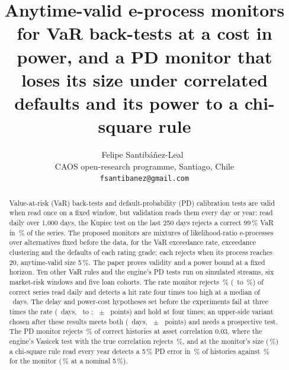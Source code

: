 \documentclass[11pt]{article}
\title{Anytime-valid e-process monitors for VaR back-tests at a cost in power, and a PD monitor that loses its size under correlated defaults and its power to a chi-square rule}
\author{Felipe Santib\'a\~nez-Leal~\orcidlink{0000-0002-0150-3246}\\
\small CAOS open-research programme, Santiago, Chile\\
\small \texttt{fsantibanez@gmail.com}}
\date{\docdate}
\begin{document}
\maketitle
\headerblock

\begin{abstract}
Value-at-risk (VaR) back-tests and default-probability (PD) calibration tests are valid when read once on a fixed window, but validation reads them every day or year:
read daily over 1,000 days, the Kupiec test on the last 250 days rejects a correct 99\,\% VaR in \nNullSizeKupTrail\,\% of the series. The proposed monitors are mixtures of likelihood-ratio e-processes over alternatives fixed before the data, for the VaR exceedance rate, exceedance clustering and the defaults of each rating grade;
each rejects when its process reaches 20, anytime-valid size 5\,\%. The paper proves validity and a power bound at a fixed horizon.
Ten other VaR rules and the engine's PD tests run on simulated streams, six market-risk windows and five loan cohorts. The rate monitor rejects \nNullSizeE\,\% (\nNullSizeELo\ to \nNullSizeEHi\,\%) of correct series read daily and detects a hit rate four times too high at a median of \nSeedsFourMed\ days.
The delay and power-cost hypotheses set before the experiments fail at three times the rate (\nSeedsThreeMed\ days, \nSeedsThreeMedLo\ to \nSeedsThreeMedHi; \nSeedsThreeCost\ $\pm$ \nSeedsThreeCostSe\ points) and hold at four times; an upper-side variant chosen after these results meets both (\nSeedsUpThreeMed\ days, \nSeedsUpThreeCost\ $\pm$ \nSeedsUpThreeCostSe\ points) and needs a prospective test.
The PD monitor rejects \nRhoZeroThreeAvg\,\% of correct histories at asset correlation $0.03$, where the engine's Vasicek test with the true correlation rejects \nPdcZeroThreeVasTrueEvery\,\%, and at the monitor's size (\nPdcMatchedSize\,\%) a chi-square rule read every year detects a 5\,\% PD error in \nPdcOneZeroFiveChiMatched\,\% of histories against \nPdOneZeroFiveAvg\,\% for the monitor (\nPdcOneZeroFiveChiSim\,\% at a nominal 5\,\%).
\end{abstract}
















\end{document}
